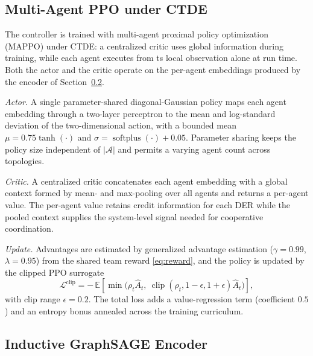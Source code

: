 \documentclass[lettersize,journal]{IEEEtran}
\begin{document}
\subsection{Multi-Agent PPO under CTDE}
\label{sec:method:mappo}

The controller is trained with multi-agent proximal policy optimization (MAPPO) \cite{yu2022mappoeffective,schulman2017ppo} under CTDE: a centralized critic uses global information during training, while each agent executes from ts local observation alone at run time. Both the actor and the critic operate on the per-agent embeddings produced by the encoder of Section~\ref{sec:method:graphsage}.

\emph{Actor.} A single parameter-shared diagonal-Gaussian policy maps each agent embedding through a two-layer perceptron to the mean and log-standard deviation of the two-dimensional action, with a bounded mean $\mu=0.75\tanh(\cdot)$ and $\sigma=\operatorname{softplus}(\cdot)+0.05$. Parameter sharing keeps the policy size independent of $|\mathcal{A}|$ and permits a varying agent count across topologies.

\emph{Critic.} A centralized critic concatenates each agent embedding with a global context formed by mean- and max-pooling over all agents and returns a per-agent value. The per-agent value retains credit information for each DER while the pooled context supplies the system-level signal needed for cooperative coordination.

\emph{Update.} Advantages are estimated by generalized advantage estimation ($\gamma=0.99$, $\lambda=0.95$) from the shared team reward
\eqref{eq:reward}, and the policy is updated by the clipped PPO surrogate 
\begin{equation}
  \mathcal{L}^{\mathrm{clip}}
   = -\,\mathbb{E}\!\left[
       \min\!\big(\rho_t\hat{A}_t,\
       \operatorname{clip}(\rho_t,1-\epsilon,1+\epsilon)\hat{A}_t\big)\right],
  \label{eq:ppo_clip}
\end{equation}
with clip range $\epsilon=0.2$. The total loss adds a value-regression term (coefficient $0.5$) and an entropy bonus annealed across the training curriculum.

\subsection{Inductive GraphSAGE Encoder}
\label{sec:method:graphsage}
\end{document}
